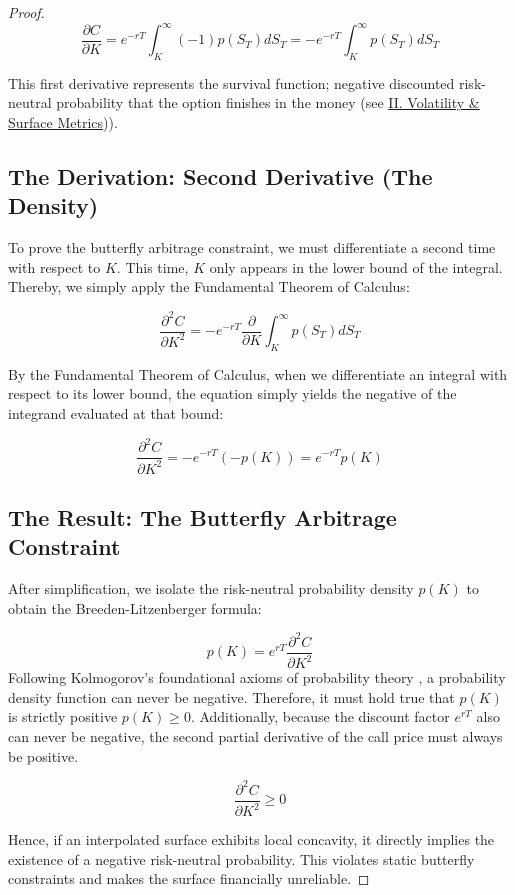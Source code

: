 \documentclass[12pt,oneside]{report}
\theoremstyle{definition}
\theoremstyle{remark}
\begin{document}
\begin{proof}
\begin{equation}
\frac{\partial C}{\partial K} = e^{-rT} \int_{K}^{\infty} (-1) p(S_T) dS_T = -e^{-rT} \int_{K}^{\infty} p(S_T) dS_T
\label{eq:disc_survival_function}
\end{equation}

This first derivative represents the survival function; negative discounted risk-neutral probability that the option finishes in the money (see \hyperref[sec:glossary_volatility_surface_metrics]{II. Volatility \& Surface Metrics})).

\subsection{The Derivation: Second Derivative (The Density)}

To prove the butterfly arbitrage constraint, we must differentiate a second time with respect to $K$. This time, $K$ only appears in the lower bound of the integral. Thereby, we simply apply the Fundamental Theorem of Calculus:

$$\frac{\partial^2 C}{\partial K^2} = -e^{-rT} \frac{\partial}{\partial K} \int_{K}^{\infty} p(S_T) dS_T$$

By the Fundamental Theorem of Calculus, when we differentiate an integral with respect to its lower bound, the equation simply yields the negative of the integrand evaluated at that bound:

\begin{equation}
\frac{\partial^2 C}{\partial K^2} = -e^{-rT} \left( -p(K) \right) = e^{-rT} p(K)
\label{eq:initial_b_l_result}
\end{equation}
\subsection{The Result: The Butterfly Arbitrage Constraint}

After simplification, we isolate the risk-neutral probability density $p(K)$ to obtain the Breeden-Litzenberger formula:

\begin{equation}
p(K) = e^{rT} \frac{\partial^2 C}{\partial K^2}
\label{eq:rearanged_b_l_result}
\end{equation}
Following Kolmogorov's foundational axioms of probability theory \cite{kolmogorov1933foundations}, a probability density function can never be negative. Therefore, it must hold true that $p(K)$ is strictly positive $p(K) \ge 0$. Additionally, because the discount factor $e^{rT}$ also can never be negative, the second partial derivative of the call price must always be positive. 

$$\frac{\partial^2 C}{\partial K^2} \ge 0$$

Hence, if an interpolated surface exhibits local concavity, it directly implies the existence of a negative risk-neutral probability. This violates static butterfly constraints and makes the surface financially unreliable.

\end{proof}
\newpage
\end{document}
